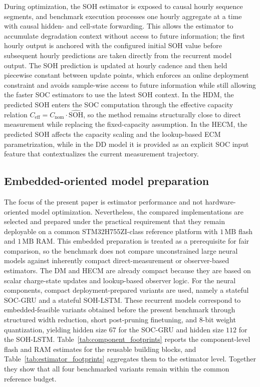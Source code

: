 \documentclass[review,nopreprintline]{elsarticle}
\begin{document}
During optimization, the SOH estimator is exposed to causal hourly sequence segments, and benchmark execution processes one hourly aggregate at a time with causal hidden- and cell-state forwarding. This allows the estimator to accumulate degradation context without access to future information; the first hourly output is anchored with the configured initial SOH value before subsequent hourly predictions are taken directly from the recurrent model output. The SOH prediction is updated at hourly cadence and then held piecewise constant between update points, which enforces an online deployment constraint and avoids sample-wise access to future information while still allowing the faster SOC estimators to use the latest SOH context. In the HDM, the predicted SOH enters the SOC computation through the effective capacity relation $C_{\mathrm{eff}} = C_{\mathrm{nom}} \cdot \widehat{\mathrm{SOH}}$, so the method remains structurally close to direct measurement while replacing the fixed-capacity assumption. In the HECM, the predicted SOH affects the capacity scaling and the lookup-based ECM parametrization, while in the DD model it is provided as an explicit SOC input feature that contextualizes the current measurement trajectory.

\subsection{Embedded-oriented model preparation}
The focus of the present paper is estimator performance and not hardware-oriented model optimization. Nevertheless, the compared implementations are selected and prepared under the practical requirement that they remain deployable on a common STM32H755ZI-class reference platform with $1\,\mathrm{MB}$ flash and $1\,\mathrm{MB}$ RAM. This embedded preparation is treated as a prerequisite for fair comparison, so the benchmark does not compare unconstrained large neural models against inherently compact direct-measurement or observer-based estimators. The DM and HECM are already compact because they are based on scalar charge-state updates and lookup-based observer logic. For the neural components, compact deployment-prepared variants are used, namely a stateful SOC-GRU and a stateful SOH-LSTM. These recurrent models correspond to embedded-feasible variants obtained before the present benchmark through structured width reduction, short post-pruning finetuning, and $8$-bit weight quantization, yielding hidden size $67$ for the SOC-GRU and hidden size $112$ for the SOH-LSTM. Table~\ref{tab:component_footprints} reports the component-level flash and RAM estimates for the reusable building blocks, and Table~\ref{tab:estimator_footprints} aggregates them to the estimator level. Together they show that all four benchmarked variants remain within the common reference budget.
\end{document}
